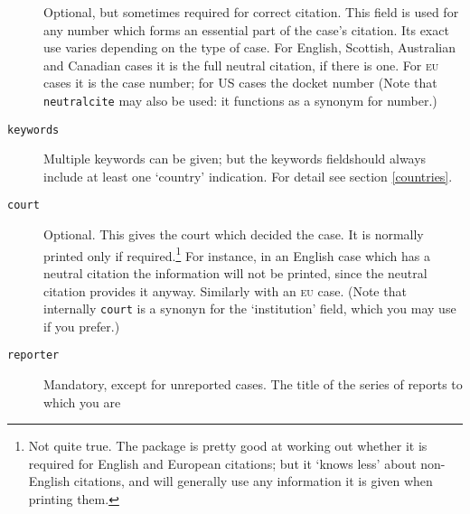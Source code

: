 \documentclass[a5paper,fontsize=9pt,DIV=1]{scrartcl}
\begin{document}
\begin{description}
Optional, but sometimes required for correct
  citation. This field is used for any number which forms an essential
  part of the case's citation. Its exact use varies depending on the
  type of case. For English, Scottish, Australian and Canadian cases it is the full neutral
  citation, if there is one. For \textsc{eu} cases it is the case
  number; for US cases the docket number (Note that \texttt{neutralcite} may also be used: it
  functions as a synonym for number.)
\item[\texttt{keywords}]
Multiple keywords can be given; but the
keywords field\linebreak should always include at least one `country'
indication. For detail see section \ref{countries}.
\item[\texttt{court}]
Optional. This gives the court which decided the
  case. It is normally printed only if required.\footnote{Not quite
    true. The package is pretty good at working out whether it is
    required for English and European citations; but it `knows less'
    about non-English citations, and will generally use any
    information it is given when printing them.} For instance, in an
  English case which has a neutral citation the information will not
  be printed, since the neutral citation provides it anyway. Similarly
  with an \textsc{eu} case. (Note that internally \texttt{court} is a
  synonyn for the `institution' field, which you may use if you
  prefer.)
\item[\texttt{reporter}]
Mandatory, except for unreported
  cases. The title of the series of reports to which you are

\end{description}
\end{document}
